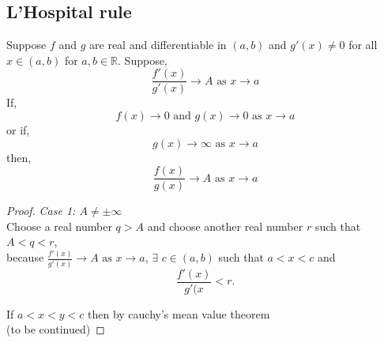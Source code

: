 \documentclass[11pt,a4paper]{colorart}
\def\R{\mathbb{R}}
\def\ra{\rightarrow}
\begin{document}
\subsection{L'Hospital rule}

\begin{theorem}
	Suppose $f$ and $g$ are real and differentiable in $(a,b)$ and $g'(x) \neq 0$ for all $x \in (a,b)$ for $a,b \in \R$. Suppose,
	\[ \frac{ f'(x) }{ g'(x) } \ra A \text{ as } x \ra a \]
	If, 
	\[ f(x) \ra 0 \text{ and } g(x) \ra 0 \text{ as } x \ra a \]
	or if,
	\[ g(x) \ra \infty \text{ as } x \ra a \]
	then,
	\[ \frac{ f(x) }{ g(x) } \ra A \text{ as } x \ra a \]
\end{theorem}

\begin{proof}

	\textit{ Case 1: $A \neq \pm \infty$} \\
	Choose a real number $q > A$ and choose another real number $r$ such that $A < q < r$,\\
	because $\frac{ f'(x) }{ g'(x) } \ra A \text{ as } x \ra a$, $\exists$ $c \in (a,b)$ such that $a < x < c$ and 
	\[ \frac{ f'(x) }{ g'(x } < r. \]
	
	If $a<x<y<c$ then by cauchy's mean value theorem\\

	(to be continued)
	
\end{proof}
\end{document}
